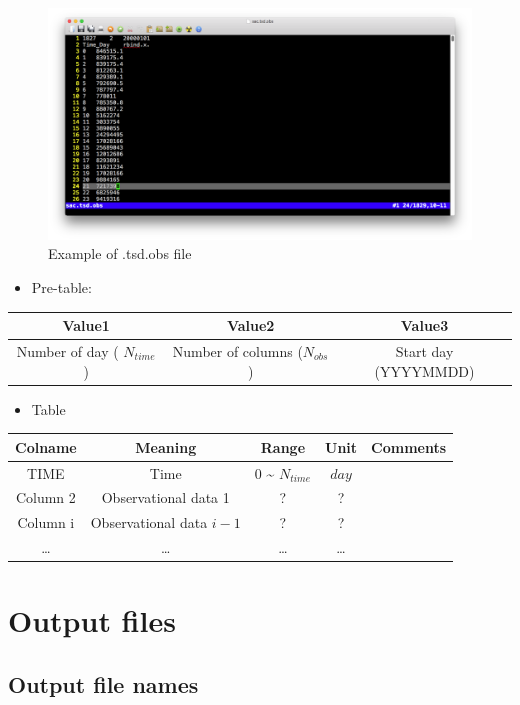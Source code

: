 \documentclass[]{scrbook}
\providecommand{\tightlist}{%
  \setlength{\itemsep}{0pt}\setlength{\parskip}{0pt}}
\begin{document}
\begin{figure}
\centering
\includegraphics{Fig/IO/tsd.obs.png}
\caption{Example of .tsd.obs file}
\end{figure}

\begin{itemize}
\tightlist
\item
  Pre-table:
\end{itemize}

\begin{longtable}[]{@{}ccc@{}}
\toprule
Value1 & Value2 & Value3\tabularnewline
\midrule
\endhead
Number of day ( \(N_{time}\)) & Number of columns (\(N_{obs}\)) & Start
day (YYYYMMDD)\tabularnewline
\bottomrule
\end{longtable}

\begin{itemize}
\tightlist
\item
  Table
\end{itemize}

\begin{longtable}[]{@{}ccccc@{}}
\toprule
Colname & Meaning & Range & Unit & Comments\tabularnewline
\midrule
\endhead
TIME & Time & 0 \textasciitilde{} \(N_{time}\) & \(day\)
&\tabularnewline
Column 2 & Observational data 1 & ? & ? &\tabularnewline
Column i & Observational data \(i-1\) & ? & ? &\tabularnewline
\ldots{} & \ldots{} & \ldots{} & \ldots{} &\tabularnewline
\bottomrule
\end{longtable}

\chapter{Output files}\label{output-files}

\section{Output file names}\label{output-file-names}
\end{document}
